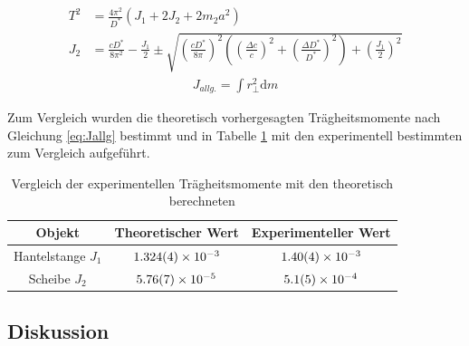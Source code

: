 \begin{align}
		T^2&= \frac{4 \pi^2}{D^*}(J_1+2J_2+2m_2 a^2)
	\label{eq:hantelta}\\
J_2&=\frac{c D^*}{8 \pi ^2}-\frac{J_1}{2} \pm \sqrt{\left( \frac{c D^*}{8 \pi}\right) ^2\left( \left( \frac{\Delta c}{c}\right) ^2+  \left( \frac{\Delta D^*}{D^*}\right) ^2\right) + \left(\frac{J_1}{2}\right)^2 }\label{eq:hantelJ2}
\end{align}
\begin{align}
	J_{allg.}=\int r_{\perp}^2 \textrm{d}m
	\label{eq:Jallg}
\end{align}

Zum Vergleich wurden die theoretisch vorhergesagten Trägheitsmomente nach Gleichung \ref{eq:Jallg} bestimmt und in Tabelle \ref{tab:vglJ} mit den experimentell bestimmten zum Vergleich aufgeführt. 

\begin{table}[h!]
	\caption{Vergleich der experimentellen Trägheitsmomente mit den theoretisch berechneten}
	\begin{tabular}{|c|c|c|}
		\hline 
		Objekt &Theoretischer Wert	& Experimenteller Wert  \\ 
		\hline 
		Hantelstange $J_1$ &$\SI{1.324\pm 0.004 e-3}{}$	& $\SI{1.40\pm 0.04e-3}{}$ \\ 
		\hline 
		Scheibe $J_2$&  $\SI{5.76\pm 0.07e-5}{}$	&$\SI{5.1 \pm 0.5  e-04}{}$ \\ 
		\hline 
	\end{tabular} 
	\label{tab:vglJ}
\end{table}








\subsection{Diskussion}

